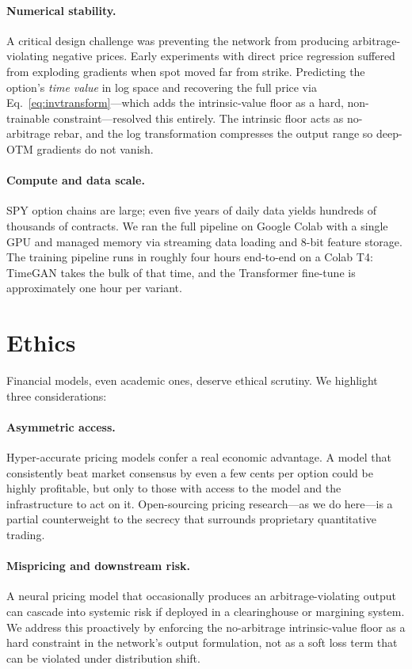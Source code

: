 \documentclass[conference]{IEEEtran}
\begin{document}
\paragraph*{Numerical stability.}
A critical design challenge was preventing the network from
producing arbitrage-violating negative prices. Early experiments
with direct price regression suffered from exploding gradients
when spot moved far from strike. Predicting the option's
\emph{time value} in log space and recovering the full price
via Eq.~\ref{eq:invtransform}---which adds the intrinsic-value
floor as a hard, non-trainable constraint---resolved this
entirely. The intrinsic floor acts as no-arbitrage rebar, and
the log transformation compresses the output range so deep-OTM
gradients do not vanish.

\paragraph*{Compute and data scale.}
SPY option chains are large; even five years of daily data
yields hundreds of thousands of contracts. We ran the full
pipeline on Google Colab with a single GPU and managed memory
via streaming data loading and 8-bit feature storage. The
training pipeline runs in roughly four hours end-to-end on
a Colab T4: TimeGAN takes the bulk of that time, and the
Transformer fine-tune is approximately one hour per variant.

\section{Ethics}

Financial models, even academic ones, deserve ethical scrutiny.
We highlight three considerations:

\paragraph*{Asymmetric access.}
Hyper-accurate pricing models confer a real economic advantage.
A model that consistently beat market consensus by even a few
cents per option could be highly profitable, but only to those
with access to the model and the infrastructure to act on it.
Open-sourcing pricing research---as we do here---is a partial
counterweight to the secrecy that surrounds proprietary
quantitative trading.

\paragraph*{Mispricing and downstream risk.}
A neural pricing model that occasionally produces an
arbitrage-violating output can cascade into systemic risk if
deployed in a clearinghouse or margining system. We address
this proactively by enforcing the no-arbitrage intrinsic-value
floor as a hard constraint in the network's output formulation,
not as a soft loss term that can be violated under
distribution shift.
\end{document}
